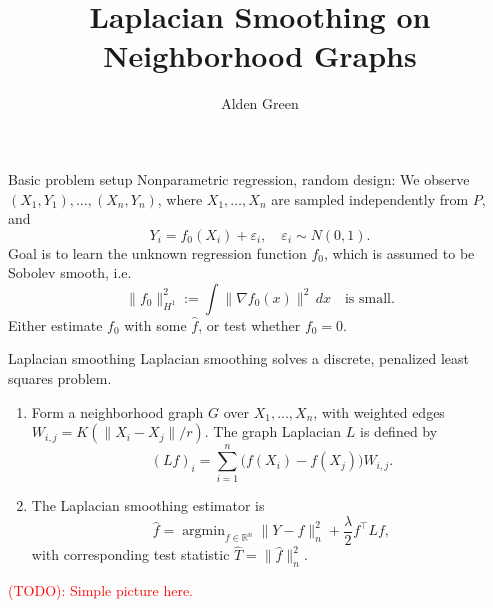 \documentclass{beamer}
\title{Laplacian Smoothing on Neighborhood Graphs}
\author{Alden Green}
\institute{Department of Statistics and Data Science \\
		   Carnegie Mellon Unviersity}
\date{}
\newcommand{\Reals}{\mathbb{R}}
\newcommand{\wh}[1]{\widehat{#1}}
\DeclareMathOperator*{\argmin}{argmin}
\begin{document}
	
\begin{frame}
\titlepage
\end{frame}

\begin{frame}{Basic problem setup}
\alert{Nonparametric regression, random design}: We observe $(X_1,Y_1),\ldots,(X_n,Y_n)$, where $X_1,\ldots,X_n$ are sampled independently from $P$, and
\begin{equation*}
Y_i = f_0(X_i) + \varepsilon_i, \quad \varepsilon_i \sim N(0,1).
\end{equation*}
Goal is to learn the unknown regression function $f_0$, which is assumed to be \alert{Sobolev} smooth, i.e.
\begin{equation*}
\|f_0\|_{H^1}^2 := \int \|\nabla f_0(x)\|^2 \,dx \quad \text{is small.}
\end{equation*}
Either \alert{estimate} $f_0$ with some $\hat{f}$, or \alert{test} whether $f_0 = 0$.
\end{frame}

\begin{frame}{Laplacian smoothing}
Laplacian smoothing solves a discrete, penalized least squares problem. 
\begin{enumerate}
	\item  Form a \alert{neighborhood graph} $G$ over $X_1,\ldots,X_n$, with weighted edges $W_{i,j} = K(\|X_i - X_j\|/r)$. The \alert{graph Laplacian} $L$ is defined by
	\begin{equation*}
	(Lf)_i = \sum_{i = 1}^{n} \bigl(f(X_i) - f(X_j)\bigr) W_{i,j}.
	\end{equation*}
	\item The \alert{Laplacian smoothing} estimator is
	\begin{equation*}
	\wh{f} = \argmin_{f \in \Reals^n} \|Y - f\|_n^2 + \frac{\lambda}{2} f^{\top} L f, \end{equation*}
	with corresponding test statistic $\wh{T} = \|\wh{f}\|_n^2$.
\end{enumerate}
\textcolor{red}{(TODO): Simple picture here.}
\end{frame}
\end{document}
